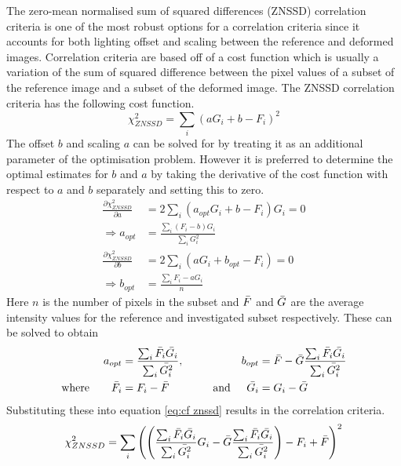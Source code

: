 \documentclass[[12pt,oneside,openany,a4paper, %
\newcommand*\mean[1]{\bar{#1}} %
\begin{document}
The zero-mean normalised sum of squared differences (ZNSSD) correlation criteria is one of the most robust options for a correlation criteria since it accounts for both lighting offset and scaling between the reference and deformed images. Correlation criteria are based off of a cost function which is usually a variation of the sum of squared difference between the pixel values of a subset of the reference image and a subset of the deformed image. The ZNSSD correlation criteria has the following cost function.
\begin{equation}
\label{eq:cf znssd}
  \chi_{ZNSSD}^2 = \sum_i \left( a G_i + b - F_i \right) ^2
\end{equation}
The offset $b$ and scaling $a$ can be solved for by treating it as an additional parameter of the optimisation problem. However it is preferred to determine the optimal estimates for $b$ and $a$ by taking the derivative of the cost function with respect to $a$ and $b$ separately and setting this to zero.
\begin{align}
  \frac{\partial \chi_{ZNSSD}^2 }{\partial a} &= 2 \sum_i \left( a_{opt} G_i + b- F_i \right) G_i = 0\\
  \Rightarrow a_{opt} &= \frac{\sum_i \left( F_i - b \right) G_i}{\sum_i G_i^2} \\
  \frac{\partial \chi_{ZNSSD}^2 }{\partial b} &= 2 \sum_i \left( a G_i + b_{opt} - F_i \right) = 0\\
  \Rightarrow b_{opt} &= \frac{\sum_i F_i -a G_i}{n}
\end{align}
Here $n$ is the number of pixels in the subset and $\mean{F}$ and $\mean{G}$  are the average intensity values for the reference and investigated subset respectively. These can be solved to obtain
\begin{align}
  a_{opt} &= \frac{\sum_i \mean{F_i} \mean{G_i}}{\sum_i \mean{G_i^2}}, &b_{opt}&= \mean{F} -\mean{G} \frac{\sum_i \mean{F_i} \mean{G_i}}{\sum_i \mean{G_i^2}} \\
  \text{where} \quad \quad \mean{F_i} &= F_i - \mean{F} \quad \quad \quad \quad \text{and} & \mean{G_i} &= G_i -\mean{G}
\end{align}
Substituting these into equation \ref{eq:cf znssd} results in the correlation criteria.
\begin{equation}
  \chi_{ZNSSD}^2 = \sum_i \left( \left( \frac{\sum_i \mean{F_i} \mean{G_i}}{\sum_i \mean{G_i^2}} G_i - \mean{G} \frac{\sum_i \mean{F_i} \mean{G_i}}{\sum_i \mean{G_i^2}} \right) - F_i + \mean{F} \right) ^2
\end{equation} 
\end{document}
